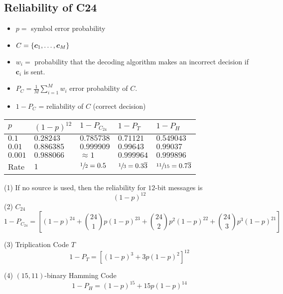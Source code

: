 \subsection*{Reliability of C24}
\begin{itemize}
    \item $ p = $ symbol error probability
    \item $ C=\{\bm{c}_1,\ldots ,\bm{c}_M\} $
    \item $ w_i = $ probability that the decoding algorithm makes an incorrect
          decision if $ \bm{c}_i $ is sent.
    \item $ P_C=\frac{1}{M} \sum\limits_{i=1}^{M} w_i $ error probability of $ C $.
    \item $ 1-P_C $ = reliability of $ C $ (correct decision)
\end{itemize}

\begin{table}[H]
    \centering
    \begin{tabularx}{\linewidth}{@{}YYYYY@{}}
        $ p $     & $ (1-p)^{12} $ & $ 1-P_{C_{24}} $     & $ 1-P_T $                        & $ 1-P_H $                          \\
        \midrule
        $ 0.1 $   & $ 0.28243 $    & $ 0.785738      $    & $ 0.71121      $                 & $ 0.549043       $                 \\
        $ 0.01 $  & $ 0.886385 $   & $ 0.999909      $    & $ 0.99643      $                 & $ 0.99037       $                  \\
        $ 0.001 $ & $ 0.988066 $   & $ \approx 1    $     & $ 0.999964     $                 & $ 0.999896        $                \\
        Rate      & $ 1        $   & $ \sfrac{1}{2}=0.5 $ & $ \sfrac{1}{3}=0.3\overline{3} $ & $ \sfrac{11}{15}= 0.7\overline{3}$ \\
    \end{tabularx}
\end{table}


(1) If no source is used, then the reliability for $ 12 $-bit messages is
\[ (1-p)^{12} \]
(2) $ C_{24} $
\[ 1-P_{C_{24}}=\left[ (1-p)^{24}+\binom{24}{1}p(1-p)^{23}+\binom{24}{2}p^2(1-p)^{22}
        + \binom{24}{3}p^3 (1-p)^{21} \right] \]

(3) Triplication Code $ T $
\[ 1-P_T=\left[ (1-p)^3+3p(1-p)^2 \right]^{12} \]

(4) $ (15,11) $-binary Hamming Code
\[ 1-P_H=(1-p)^{15}+15p(1-p)^{14} \]
